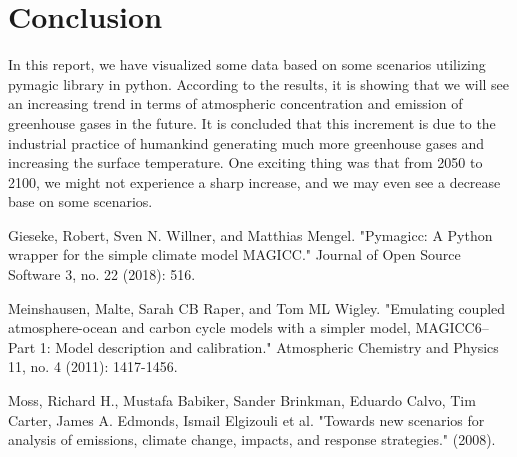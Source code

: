 \documentclass[12pt]{article}
\begin{document}
\section{Conclusion}
\label{lab:conclusion}
In this report, we have visualized some data based on some scenarios utilizing pymagic library in python. According to the results, it is showing that we will see an increasing trend in terms of atmospheric concentration and emission of greenhouse gases in the future. It is concluded that this increment is due to the industrial practice of humankind generating much more greenhouse gases and increasing the surface temperature. One exciting thing was that from 2050 to 2100, we might not experience a sharp increase, and we may even see a decrease base on some scenarios. 

\begin{thebibliography}{9}
Gieseke, Robert, Sven N. Willner, and Matthias Mengel. "Pymagicc: A Python wrapper for the simple climate model MAGICC." Journal of Open Source Software 3, no. 22 (2018): 516.

Meinshausen, Malte, Sarah CB Raper, and Tom ML Wigley. "Emulating coupled atmosphere-ocean and carbon cycle models with a simpler model, MAGICC6–Part 1: Model description and calibration." Atmospheric Chemistry and Physics 11, no. 4 (2011): 1417-1456.

Moss, Richard H., Mustafa Babiker, Sander Brinkman, Eduardo Calvo, Tim Carter, James A. Edmonds, Ismail Elgizouli et al. "Towards new scenarios for analysis of emissions, climate change, impacts, and response strategies." (2008).

\end{thebibliography}
\end{document}
